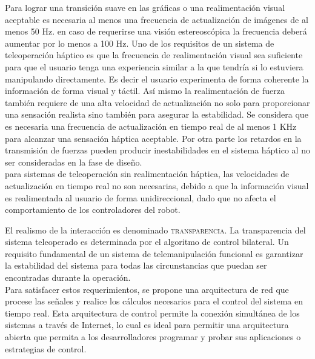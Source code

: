 Para lograr una transición suave en las gráficas o una realimentación visual aceptable es necesaria al menos una frecuencia de actualización de imágenes de al menos 50 Hz. en caso de requerirse una visión estereoscópica la frecuencia deberá aumentar por lo menos a 100 Hz. Uno de los requisitos de un sistema de teleoperaci\'on h\'aptico es que la frecuencia de realimentaci\'on visual sea suficiente para que el usuario tenga una experiencia similar a la que tendr\'ia si lo estuviera manipulando directamente. Es decir el usuario experimenta de forma coherente la información de forma visual y táctil. As\'i mismo la realimentación de fuerza también  requiere de una alta velocidad de actualización no solo para proporcionar una sensación realista sino también para asegurar la estabilidad. Se considera que es necesaria una frecuencia de actualización en tiempo real de al menos 1 KHz para alcanzar una sensación h\'aptica aceptable. Por otra parte los retardos en la transmisión de fuerzas pueden producir inestabilidades en el sistema h\'aptico al no ser consideradas en la fase de diseño.\\


 para sistemas de teleoperación sin realimentación háptica, las velocidades de actualización en tiempo real no son necesarias, debido a que la información visual es realimentada al usuario de forma unidireccional, dado que no afecta el comportamiento de los controladores del robot. 


El realismo de la interacción es denominado \textsc{transparencia}. La transparencia del sistema teleoperado es determinada por el algoritmo de control bilateral. Un requisito fundamental de un sistema de telemanipulaci\'on funcional es garantizar la estabilidad del sistema para todas las circunstancias que puedan ser encontradas durante la operación.\\


Para satisfacer estos requerimientos, se propone una arquitectura de red que procese las señales y realice los cálculos necesarios para el control del sistema en tiempo real. Esta arquitectura de control permite la conexión simult\'anea de los sistemas a través de Internet, lo cual es ideal para permitir una arquitectura abierta que permita a los desarrolladores programar y probar  sus aplicaciones  o estrategias de control.




